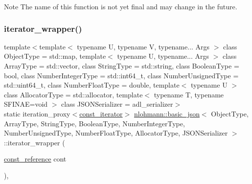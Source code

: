 \begin{DoxyNote}{Note}
The name of this function is not yet final and may change in the future. 
\end{DoxyNote}
\mbox{\label{classnlohmann_1_1basic__json_adb4db7abbc5ba12c9273f032a7b89198}} 
\subsubsection{\texorpdfstring{iterator\_wrapper()}{iterator\_wrapper()}\hspace{0.1cm}{\footnotesize\ttfamily [2/2]}}
{\footnotesize\ttfamily template$<$template$<$ typename U, typename V, typename... Args $>$ class Object\+Type = std\+::map, template$<$ typename U, typename... Args $>$ class Array\+Type = std\+::vector, class String\+Type  = std\+::string, class Boolean\+Type  = bool, class Number\+Integer\+Type  = std\+::int64\+\_\+t, class Number\+Unsigned\+Type  = std\+::uint64\+\_\+t, class Number\+Float\+Type  = double, template$<$ typename U $>$ class Allocator\+Type = std\+::allocator, template$<$ typename T, typename S\+F\+I\+N\+A\+E=void $>$ class J\+S\+O\+N\+Serializer = adl\+\_\+serializer$>$ \\
static iteration\+\_\+proxy$<$\mbox{\hyperlink{classnlohmann_1_1basic__json_a41a70cf9993951836d129bb1c2b3126a}{const\+\_\+iterator}}$>$ \mbox{\hyperlink{classnlohmann_1_1basic__json}{nlohmann\+::basic\+\_\+json}}$<$ Object\+Type, Array\+Type, String\+Type, Boolean\+Type, Number\+Integer\+Type, Number\+Unsigned\+Type, Number\+Float\+Type, Allocator\+Type, J\+S\+O\+N\+Serializer $>$\+::iterator\+\_\+wrapper (\begin{DoxyParamCaption}\item[{\mbox{\hyperlink{classnlohmann_1_1basic__json_a4057c5425f4faacfe39a8046871786ca}{const\+\_\+reference}}}]{cont }\end{DoxyParamCaption})\hspace{0.3cm}{\ttfamily [inline]}, {\ttfamily [static]}}



